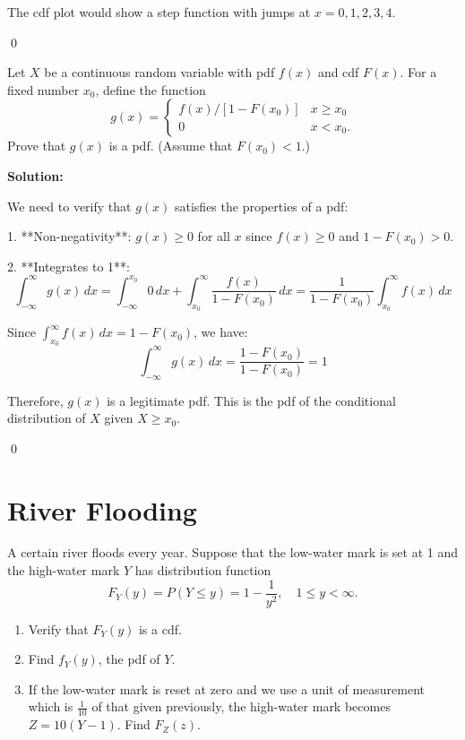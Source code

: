 The cdf plot would show a step function with jumps at $x = 0, 1, 2, 3, 4$.



\qed
\begin{problembox}
Let $X$ be a continuous random variable with pdf $f(x)$ and cdf $F(x)$. For a fixed number $x_{0}$, define the function
\[ g(x)=\left\{\begin{array}{ll}
f(x)/[1-F(x_{0})] & x\geq x_{0}\\
0 & x<x_{0}.
\end{array}\right. \]
Prove that $g(x)$ is a pdf. (Assume that $F(x_{0})<1$.)
\end{problembox}

\noindent\textbf{Solution:}

We need to verify that $g(x)$ satisfies the properties of a pdf:

1. **Non-negativity**: $g(x) \geq 0$ for all $x$ since $f(x) \geq 0$ and $1 - F(x_0) > 0$.

2. **Integrates to 1**:
   \[ \int_{-\infty}^{\infty} g(x) \, dx = \int_{-\infty}^{x_0} 0 \, dx + \int_{x_0}^{\infty} \frac{f(x)}{1 - F(x_0)} \, dx = \frac{1}{1 - F(x_0)} \int_{x_0}^{\infty} f(x) \, dx \]
   
   Since $\int_{x_0}^{\infty} f(x) \, dx = 1 - F(x_0)$, we have:
   \[ \int_{-\infty}^{\infty} g(x) \, dx = \frac{1 - F(x_0)}{1 - F(x_0)} = 1 \]

Therefore, $g(x)$ is a legitimate pdf. This is the pdf of the conditional distribution of $X$ given $X \geq x_0$.



\qed
\section{River Flooding}

\begin{problembox}
A certain river floods every year. Suppose that the low-water mark is set at 1 and the high-water mark $Y$ has distribution function
\[ F_Y(y) = P(Y \leq y) = 1 - \frac{1}{y^2}, \quad 1 \leq y < \infty. \]
\begin{enumerate}[label=(\alph*)]
    \item Verify that $F_Y(y)$ is a cdf.
    \item Find $f_Y(y)$, the pdf of $Y$.
    \item If the low-water mark is reset at zero and we use a unit of measurement which is $\frac{1}{10}$ of that given previously, the high-water mark becomes $Z = 10(Y - 1)$. Find $F_Z(z)$.
\end{enumerate}
\end{problembox}

